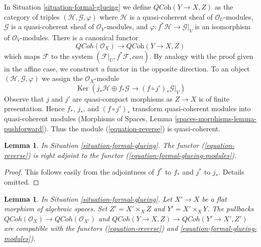 \documentclass{stacks-project}
\theoremstyle{plain}
\newtheorem{lemma}[subsection]{Lemma}
\theoremstyle{definition}
\theoremstyle{remark}
\numberwithin{equation}{subsection}
\def\QCoh{\mathit{QCoh}}
\def\Ker{\mathop{\mathrm{Ker}}}
\begin{document}
\noindent
In Situation \ref{situation-formal-glueing} we define
$\textit{QCoh}(Y \to X, Z)$ as the category of
triples $(\mathcal{H}, \mathcal{G}, \varphi)$ where
$\mathcal{H}$ is a quasi-coherent sheaf of
$\mathcal{O}_U$-modules, $\mathcal{G}$ is a quasi-coherent sheaf
of $\mathcal{O}_Y$-modules, and
$\varphi : f^*\mathcal{H} \to \mathcal{G}|_V$ is an isomorphism
of $\mathcal{O}_V$-modules. There is a canonical
functor
\begin{equation}
\label{equation-formal-glueing-modules}
\QCoh(\mathcal{O}_X) \longrightarrow \textit{QCoh}(Y \to X, Z)
\end{equation}
which maps $\mathcal{F}$ to the system
$(\mathcal{F}|_U, f^*\mathcal{F}, can)$.
By analogy with the proof given in the affine case, we construct
a functor in the opposite direction. To an object
$(\mathcal{H}, \mathcal{G}, \varphi)$ we assign the $\mathcal{O}_X$-module
\begin{equation}
\label{equation-reverse}
\Ker(j_*\mathcal{H} \oplus f_*\mathcal{G} \to (f \circ j')_*\mathcal{G}|_V)
\end{equation}
Observe that $j$ and $j'$ are quasi-compact morphisms as
$Z \to X$ is of finite presentation. Hence $f_*$, $j_*$, and $(f \circ j')_*$
transform quasi-coherent modules into quasi-coherent modules
(Morphisms of Spaces, Lemma \ref{spaces-morphisms-lemma-pushforward}).
Thus the module (\ref{equation-reverse}) is quasi-coherent.

\begin{lemma}
\label{lemma-adjoint}
In Situation \ref{situation-formal-glueing}.
The functor (\ref{equation-reverse}) is right adjoint to
the functor (\ref{equation-formal-glueing-modules}).
\end{lemma}

\begin{proof}
This follows easily from the adjointness of $f^*$ to $f_*$
and $j^*$ to $j_*$. Details omitted.
\end{proof}

\begin{lemma}
\label{lemma-reverse-commutes-with-flat-base-change}
In Situation \ref{situation-formal-glueing}.
Let $X' \to X$ be a flat morphism of algebraic spaces.
Set $Z' = X' \times_X Z$ and $Y' = X' \times_X Y$.
The pullbacks $\QCoh(\mathcal{O}_X) \to \QCoh(\mathcal{O}_{X'})$
and $\QCoh(Y \to X, Z) \to \QCoh(Y' \to X', Z')$ are compatible
with the functors (\ref{equation-reverse}) and
\ref{equation-formal-glueing-modules}).
\end{lemma}
\end{document}
